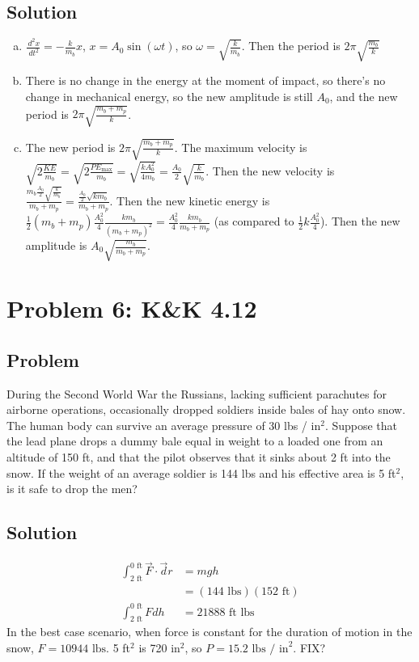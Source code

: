 \documentclass[solutions]{esg8012pset}
\renewcommand{\d}{\,d}
\begin{document}
\subsection*{Solution}
  \begin{enumerate}[a)]
    \item $\frac{\d^2 x}{\d t^2} = -\frac{k}{m_b}x$, $x = A_0\sin(\omega t)$, so $\omega = \sqrt{\frac{k}{m_b}}$.  Then the period is $2\pi \sqrt{\frac{m_b}{k}}$
    \item There is no change in the energy at the moment of impact, so there's no change in mechanical energy, so the new amplitude is still $A_0$, and the new period is $2\pi\sqrt{\frac{m_b + m_p}{k}}$.
    \item The new period is $2\pi\sqrt{\frac{m_b + m_p}{k}}$.  The maximum velocity is $\sqrt{2\frac{KE}{m_b}} = \sqrt{2\frac{PE_{\text{max}}}{m_b}} = \sqrt{\frac{k A_0^2}{4m_b}} = \frac{A_0}{2} \sqrt{\frac{k}{m_b}}$.  Then the new velocity is $\frac{m_b\frac{A_0}{2}\sqrt{\frac{k}{m_b}}}{m_b + m_p} = \frac{\frac{A_0}{2}\sqrt{k m_b}}{m_b + m_p}$.  Then the new kinetic energy is $\frac{1}{2}(m_b + m_p)\frac{A_0^2}{4}\frac{k m_b}{(m_b + m_p)^2} = \frac{A_0^2}{4}\frac{k m_b}{m_b + m_p}$ (as compared to $\frac{1}{2}k \frac{A_0^2}{4}$).  Then the new amplitude is $A_0\sqrt{\frac{m_b}{m_b + m_p}}$.
  \end{enumerate}
\section*{Problem 6: K\&K 4.12}
\subsection*{Problem}
  During the Second World War the Russians, lacking sufficient parachutes for airborne operations, occasionally dropped soldiers inside bales of hay onto snow. The human body can survive an average pressure of 30 lbs / in$^2$. Suppose that the lead plane drops a dummy bale equal in weight to a loaded one from an altitude of 150 ft, and that the pilot observes that it sinks about 2 ft into the snow. If the weight of an average soldier is 144 lbs and his effective area is 5 ft$^2$, is it safe to drop the men?
\subsection*{Solution}
  \begin{align*}
    \int_{2\text{ ft}}^{0\text{ ft}} \vec F \cdot \vec d r & = m g h \\
    & = (144\text{ lbs})(152\text{ ft}) \\
    \int_{2\text{ ft}}^{0\text{ ft}} F d h & = 21888\text{ ft lbs}
  \end{align*}
  In the best case scenario, when force is constant for the duration of motion in the snow, $F = 10944\text{ lbs}$.  5 ft$^2$ is 720 in$^2$, so $P = 15.2\text{ lbs / in}^2$.  FIX?
\end{document}
